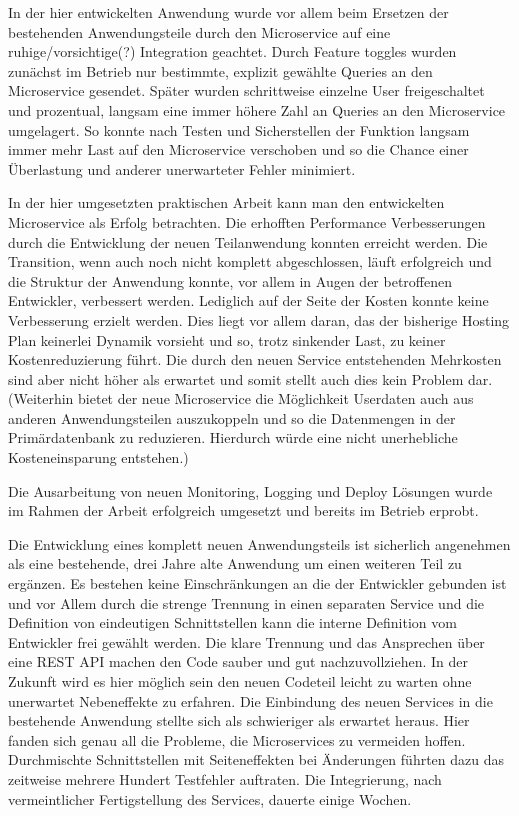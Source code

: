 In der hier entwickelten Anwendung wurde vor allem beim Ersetzen der bestehenden Anwendungsteile durch den Microservice auf eine ruhige/vorsichtige(?) Integration geachtet. Durch Feature toggles wurden zunächst im Betrieb nur bestimmte, explizit gewählte Queries an den Microservice gesendet. Später wurden schrittweise einzelne User freigeschaltet und prozentual, langsam eine immer höhere Zahl an Queries an den Microservice umgelagert. So konnte nach Testen und Sicherstellen der Funktion langsam immer mehr Last auf den Microservice verschoben und so die Chance einer Überlastung und anderer unerwarteter Fehler minimiert.

In der hier umgesetzten praktischen Arbeit kann man den entwickelten Microservice als Erfolg betrachten. Die erhofften Performance Verbesserungen durch die Entwicklung der neuen Teilanwendung konnten erreicht werden. Die Transition, wenn auch noch nicht komplett abgeschlossen, läuft erfolgreich und die Struktur der Anwendung konnte, vor allem in Augen der betroffenen Entwickler, verbessert werden. Lediglich auf der Seite der Kosten konnte keine Verbesserung erzielt werden. Dies liegt vor allem daran, das der bisherige Hosting Plan keinerlei Dynamik vorsieht und so, trotz sinkender Last, zu keiner Kostenreduzierung führt. Die durch den neuen Service entstehenden Mehrkosten sind aber nicht höher als erwartet und somit stellt auch dies kein Problem dar. (Weiterhin bietet der neue Microservice die Möglichkeit Userdaten auch aus anderen Anwendungsteilen auszukoppeln und so die Datenmengen in der Primärdatenbank zu reduzieren. Hierdurch würde eine nicht unerhebliche Kosteneinsparung entstehen.)

Die Ausarbeitung von neuen Monitoring, Logging und Deploy Lösungen wurde im Rahmen der Arbeit erfolgreich umgesetzt und bereits im Betrieb erprobt.

Die Entwicklung eines komplett neuen Anwendungsteils ist sicherlich angenehmen als eine bestehende, drei Jahre alte Anwendung um einen weiteren Teil zu ergänzen. Es bestehen keine Einschränkungen an die der Entwickler gebunden ist und vor Allem durch die strenge Trennung in einen separaten Service und die Definition von eindeutigen Schnittstellen kann die interne Definition vom Entwickler frei gewählt werden. Die klare Trennung und das Ansprechen über eine REST API machen den Code sauber und gut nachzuvollziehen. In der Zukunft wird es hier möglich sein den neuen Codeteil leicht zu warten ohne unerwartet Nebeneffekte zu erfahren. Die Einbindung des neuen Services in die bestehende Anwendung stellte sich als schwieriger als erwartet heraus. Hier fanden sich genau all die Probleme, die Microservices zu vermeiden hoffen. Durchmischte Schnittstellen mit Seiteneffekten bei Änderungen führten dazu das zeitweise mehrere Hundert Testfehler auftraten. Die Integrierung, nach vermeintlicher Fertigstellung des Services, dauerte einige Wochen.


